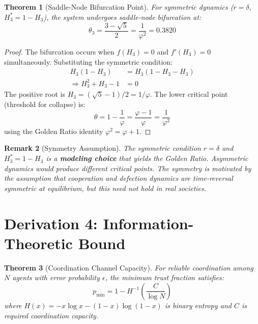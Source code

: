 \documentclass[11pt,twocolumn]{article}
\newtheorem{theorem}{Theorem}[section]
\newtheorem{remark}[theorem]{Remark}
\begin{document}
\begin{theorem}[Saddle-Node Bifurcation Point]
\label{thm:bifurcation}
For symmetric dynamics ($r = \delta$, $H_3^* = 1 - H_3$), the system undergoes saddle-node bifurcation at:
\begin{equation}
\theta_3 = \frac{3 - \sqrt{5}}{2} = \frac{1}{\varphi^2} = \mathbf{0.3820}
\end{equation}
\end{theorem}

\begin{proof}
The bifurcation occurs when $f(H_3) = 0$ and $f'(H_3) = 0$ simultaneously. Substituting the symmetric condition:
\begin{align}
H_3(1-H_3) &= H_3(1-H_3-H_3) \\
\Rightarrow H_3^2 + H_3 - 1 &= 0
\end{align}
The positive root is $H_3 = (\sqrt{5}-1)/2 = 1/\varphi$. The lower critical point (threshold for collapse) is:
\begin{equation}
\theta = 1 - \frac{1}{\varphi} = \frac{\varphi - 1}{\varphi} = \frac{1}{\varphi^2}
\end{equation}
using the Golden Ratio identity $\varphi^2 = \varphi + 1$.
\end{proof}

\begin{remark}[Symmetry Assumption]
The symmetric condition $r = \delta$ and $H_3^* = 1 - H_3$ is a \textbf{modeling choice} that yields the Golden Ratio. Asymmetric dynamics would produce different critical points. The symmetry is motivated by the assumption that cooperation and defection dynamics are time-reversal symmetric at equilibrium, but this need not hold in real societies.
\end{remark}

\section{Derivation 4: Information-Theoretic Bound}

\begin{theorem}[Coordination Channel Capacity]
\label{thm:channel}
For reliable coordination among $N$ agents with error probability $\epsilon$, the minimum trust fraction satisfies:
\begin{equation}
p_{\min} = 1 - H^{-1}\left(\frac{C}{\log N}\right)
\end{equation}
where $H(x) = -x\log x - (1-x)\log(1-x)$ is binary entropy and $C$ is required coordination capacity.
\end{theorem}
\end{document}
